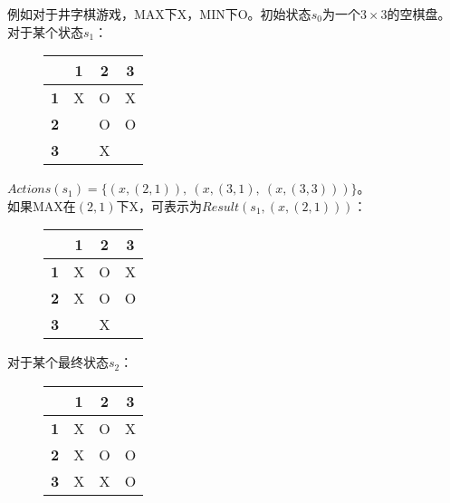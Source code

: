 例如对于井字棋游戏，MAX下X，MIN下O。初始状态$ s_0 $为一个$ 3 \times 3 $的空棋盘。\\

对于某个状态$ s_1 $：

\begin{figure}[H]
    \centering
    \begin{tabular}{|c|c|c|c|}
        \hline
                   & \textbf{1} & \textbf{2} & \textbf{3} \\
        \hline
        \textbf{1} & X          & O          & X          \\
        \hline
        \textbf{2} &            & O          & O          \\
        \hline
        \textbf{3} &            & X          &            \\
        \hline
    \end{tabular}
\end{figure}

$ Actions(s_1) = \{(x, (2,1)),\ (x, (3,1),\ (x, (3,3)))\} $。\\

如果MAX在$ (2, 1) $下X，可表示为$ Result(s_1, (x, (2,1)))$：

\begin{figure}[H]
    \centering
    \begin{tabular}{|c|c|c|c|}
        \hline
                   & \textbf{1} & \textbf{2} & \textbf{3} \\
        \hline
        \textbf{1} & X          & O          & X          \\
        \hline
        \textbf{2} & X          & O          & O          \\
        \hline
        \textbf{3} &            & X          &            \\
        \hline
    \end{tabular}
\end{figure}

对于某个最终状态$ s_2 $：

\begin{figure}[H]
    \centering
    \begin{tabular}{|c|c|c|c|}
        \hline
                   & \textbf{1} & \textbf{2} & \textbf{3} \\
        \hline
        \textbf{1} & X          & O          & X          \\
        \hline
        \textbf{2} & X          & O          & O          \\
        \hline
        \textbf{3} & X          & X          & O          \\
        \hline
    \end{tabular}
\end{figure}

